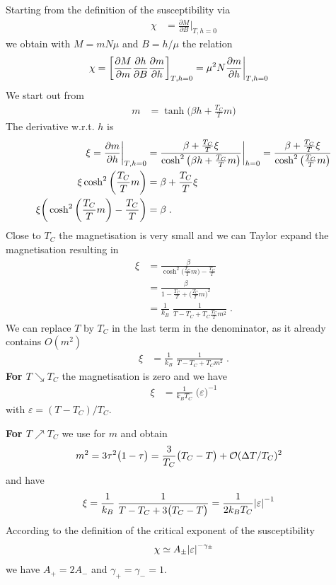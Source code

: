 Starting from the definition of the susceptibility via
%
\begin{align*}
\chi &= \frac{\partial M}{\partial B}\bigg|_{T,h=0}
\end{align*}
%
we obtain with $M=m N\mu$ and $B=h/\mu$ the relation 
%
\begin{align*}
\chi &= \left[ \frac{\partial M}{\partial m} \frac{\partial h}{\partial B} \frac{\partial m}{\partial h}  \right]_{T,h=0} = \mu^{2} N\frac{\partial m}{\partial h}\bigg|_{T,h=0}
\end{align*}
We start out from 
%
\begin{align*}
m &= \tanh\big(\beta h  +  \frac{T_{C}}{T} m\big)
\end{align*}
%
The derivative w.r.t. $h$ is
%
\begin{align*}
\xi=\frac{\partial m}{\partial h}\bigg|_{T, h=0} &=
\frac{\beta + \frac{T_{C}}{T} \xi}{\cosh^{2}\big( \beta h  +  \frac{T_{C}}{T} m \big)}\bigg|_{h=0}=
\frac{\beta + \frac{T_{C}}{T} \xi}{\cosh^{2}\big(\frac{T_{C}}{T} m \big)}\\
\xi \cosh^{2}\left(\frac{T_{C}}{T} m \right) &= \beta+ \frac{T_{C}}{T} \xi \\
\xi\bigg( \cosh^{2}\left(\frac{T_{C}}{T} m \right) - \frac{T_{C}}{T} \bigg) &= \beta\;.
\end{align*}
%
Close to $T_{C}$ the magnetisation is very small and we can Taylor expand the magnetisation
resulting in
%
\begin{align*}
\xi &= \frac{\beta}{ \cosh^{2}\big(\frac{T_{C}}{T} m \big) - \frac{T_{C}}{T} }\\
 &= \frac{\beta}{ 1 - \frac{T_{C}}{T} + \big( \frac{T_{C}}{T} m \big)^{2}}\\
 &= \frac{1}{k_{B}}\;\frac{1}{ T - T_{C}+  T_{C} \frac{T_{C}}{T} m^{2} }\;.
\end{align*}
%
We can replace $T$ by $T_{C}$ in the last term in the denominator, as it already contains $O(m^{2})$
%
\begin{align*}
\xi &= \frac{1}{k_{B}}\;\frac{1}{ T - T_{C}+  T_{C}  m^{2} }\;.
\end{align*}
%
{\bf For $T\searrow T_{C}$} the magnetisation is zero and we have 
\begin{align*}
\xi &= \frac{1}{k_{B} T_{C}} \;\big(\varepsilon\big)^{-1}
\end{align*}
with $\varepsilon=(T-T_{C})/T_{C}$.

\noindent
{\bf For $T\nearrow T_{C}$}  
we use   for $m$ and obtain 
%
\begin{align*}
m^{2} &= 3 \tau^{2}\big( 1-\tau \big) = \frac{3}{T_{C}} \big( T_{C}-T \big) + {\cal O}(\Delta T/T_{C})^{2}
\end{align*}
%
and have
%
\begin{align*}
\xi &= \frac{1}{k_{B}}\;\frac{1}{ T - T_{C}+ 3  \big( T_{C}-T \big) }
= \frac{1}{2 k_{B}T_{C}}\abs{\varepsilon}^{-1}
\end{align*}
According to the definition of the critical exponent of the susceptibility 
%
\begin{align*}
\chi \simeq A_{\pm } \abs{\varepsilon}^{-\gamma_{\pm}}
\end{align*}
%
we have $A_{+}= 2 A_{-}$ and $\gamma_{+}=\gamma_{-}=1$.
%
